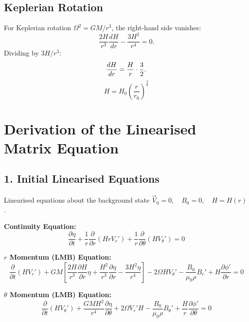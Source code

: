 \documentclass[11pt]{article}
\begin{document}
\subsection*{Keplerian Rotation}

For Keplerian rotation $\Omega^2 = GM/r^3$, the right-hand side
vanishes:
\begin{equation}
\frac{2H}{r^3}\frac{dH}{dr} - \frac{3H^2}{r^4} = 0.
\end{equation}
Dividing by $3H/r^3$:
\begin{equation}
\frac{dH}{dr} = \frac{H}{r}\cdot\frac{3}{2}.\\
\end{equation}
\begin{equation}
H=H_0\left(\frac{r}{r_0}\right)^\frac{3}{2}
\end{equation}

\section*{Derivation of the Linearised Matrix Equation}

\subsection*{1. Initial Linearised Equations}
Linearised equations about the background state $\vec{V}_0 = 0, \quad B_0 = 0, \quad H=H(r)$.

\textbf{Continuity Equation:}
\begin{equation}
\frac{\partial \eta}{\partial t} + \frac{1}{r} \frac{\partial}{\partial r} (H r V_r') + \frac{1}{r} \frac{\partial}{\partial \theta} (H V_\theta') = 0
\end{equation}

\textbf{$r$ Momentum (LMB) Equation:}
\begin{equation}
\frac{\partial}{\partial t}(H V_r') + GM \left[ \frac{2H}{r^3} \frac{\partial H}{\partial r} \eta + \frac{H^2}{r^3} \frac{\partial \eta}{\partial r} - \frac{3H^2\eta}{r^4} \right] - 2\Omega H V_\theta' - \frac{B_0}{\mu_0 \rho} B_r' + H \frac{\partial \phi'}{\partial r} = 0
\end{equation}

\textbf{$\theta$ Momentum (LMB) Equation:}
\begin{equation}
\frac{\partial}{\partial t} (H V_\theta') + \frac{GM H^2}{r^4} \frac{\partial \eta}{\partial \theta} + 2 \Omega V_r' H - \frac{B_0}{\mu_0 \rho} B_\theta' + \frac{H}{r} \frac{\partial \phi'}{\partial \theta} = 0
\end{equation}
\end{document}
